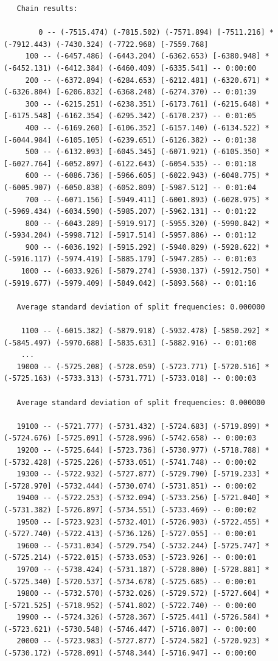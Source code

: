 \documentclass[12pt]{book}
\begin{document}
\begin{singlespacing}
\tiny
\begin{verbatim}
   Chain results:
       
        0 -- (-7515.474) (-7815.502) (-7571.894) [-7511.216] * (-7912.443) (-7430.324) (-7722.968) [-7559.768] 
     100 -- (-6457.486) (-6443.204) (-6362.653) [-6380.948] * (-6452.131) (-6412.384) (-6460.409) [-6335.541] -- 0:00:00
     200 -- (-6372.894) (-6284.653) [-6212.481] (-6320.671) * (-6326.804) [-6206.832] (-6368.248) (-6274.370) -- 0:01:39
     300 -- (-6215.251) (-6238.351) [-6173.761] (-6215.648) * [-6175.548] (-6162.354) (-6295.342) (-6170.237) -- 0:01:05
     400 -- (-6169.260) [-6106.352] (-6157.140) (-6134.522) * [-6044.984] (-6105.105) (-6239.651) (-6126.382) -- 0:01:38
     500 -- (-6132.093) [-6045.345] (-6071.921) (-6105.350) * [-6027.764] (-6052.897) (-6122.643) (-6054.535) -- 0:01:18
     600 -- (-6086.736) [-5966.605] (-6022.943) (-6048.775) * (-6005.907) (-6050.838) (-6052.809) [-5987.512] -- 0:01:04
     700 -- (-6071.156) [-5949.411] (-6001.893) (-6028.975) * (-5969.434) (-6034.590) (-5985.207) [-5962.131] -- 0:01:22
     800 -- (-6043.289) [-5919.917] (-5955.320) (-5990.842) * (-5934.204) (-5998.712) [-5917.514] (-5957.886) -- 0:01:12
     900 -- (-6036.192) [-5915.292] (-5940.829) (-5928.622) * (-5916.117) (-5974.419) [-5885.179] (-5947.285) -- 0:01:03
    1000 -- (-6033.926) [-5879.274] (-5930.137) (-5912.750) * (-5919.677) (-5979.409) [-5849.042] (-5893.568) -- 0:01:16

   Average standard deviation of split frequencies: 0.000000
      
    1100 -- (-6015.382) (-5879.918) (-5932.478) [-5850.292] * (-5845.497) (-5970.688) [-5835.631] (-5882.916) -- 0:01:08
    ...
   19000 -- (-5725.208) (-5728.059) (-5723.771) [-5720.516] * (-5725.163) (-5733.313) (-5731.771) [-5733.018] -- 0:00:03

   Average standard deviation of split frequencies: 0.000000

   19100 -- (-5721.777) (-5731.432) [-5724.683] (-5719.899) * (-5724.676) [-5725.091] (-5728.996) (-5742.658) -- 0:00:03
   19200 -- (-5725.644) [-5723.736] (-5730.977) (-5718.788) * [-5732.428] (-5725.226) (-5733.051) (-5741.748) -- 0:00:02
   19300 -- (-5722.932) (-5727.877) (-5729.790) [-5719.233] * [-5728.970] (-5732.444) (-5730.074) (-5731.851) -- 0:00:02
   19400 -- (-5722.253) (-5732.094) (-5733.256) [-5721.040] * (-5731.382) [-5726.897] (-5734.551) (-5733.469) -- 0:00:02
   19500 -- [-5723.923] (-5732.401) (-5726.903) (-5722.455) * (-5727.740) (-5722.413) (-5736.126) [-5727.055] -- 0:00:01
   19600 -- (-5731.034) (-5729.754) (-5732.244) [-5725.747] * (-5725.214) (-5722.015) (-5733.053) [-5723.926] -- 0:00:01
   19700 -- (-5738.424) (-5731.187) (-5728.800) [-5728.881] * (-5725.340) [-5720.537] (-5734.678) (-5725.685) -- 0:00:01
   19800 -- (-5732.570) (-5732.026) (-5729.572) [-5727.604] * [-5721.525] (-5718.952) (-5741.802) (-5722.740) -- 0:00:00
   19900 -- (-5724.326) (-5728.367) [-5725.441] (-5726.584) * (-5723.621) (-5730.548) (-5746.447) [-5716.807] -- 0:00:00
   20000 -- (-5723.983) (-5727.877) [-5724.582] (-5720.923) * (-5730.172) (-5728.091) (-5748.344) [-5716.947] -- 0:00:00


\end{verbatim}
\end{singlespacing}
\end{document}
